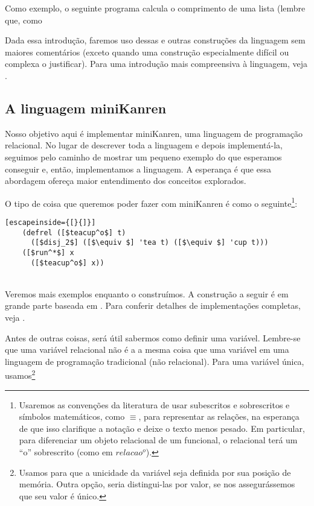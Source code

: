 \documentclass{article}
\begin{document}
  Como exemplo, o seguinte programa calcula o comprimento de uma lista
  (lembre que, como 

  Dada essa introdução, faremos uso dessas e outras construções da
  linguagem sem maiores comentários (exceto quando uma construção
  especialmente difícil ou complexa o justificar). Para uma introdução
  mais compreensiva à linguagem, veja \cite{kent}.

  \subsection{A linguagem miniKanren}

  Nosso objetivo aqui é implementar miniKanren, uma linguagem de
  programação relacional. No lugar de descrever toda a linguagem e
  depois implementá-la, seguimos pelo caminho de mostrar um pequeno
  exemplo do que esperamos conseguir e, então, implementamos a
  linguagem. A esperança é que essa abordagem ofereça maior
  entendimento dos conceitos explorados.

  O tipo de coisa que queremos poder fazer com miniKanren é como o
  seguinte\footnote{Usaremos as convenções da literatura de usar
    subescritos e sobrescritos e símbolos matemáticos, como $\equiv $, para
    representar as relações, na esperança de que isso clarifique a
    notação e deixe o texto menos pesado. Em particular, para
    diferenciar um objeto relacional de um funcional, o relacional
    terá um ``o'' sobrescrito (como em $relacao^o$).}:\\

  \begin{lstlisting}[escapeinside={[}{]}]
    (defrel ([$teacup^o$] t)
      ([$disj_2$] ([$\equiv $] 'tea t) ([$\equiv $] 'cup t)))
    ([$run^*$] x
      ([$teacup^o$] x))
  \end{lstlisting}
  \hspace{1cm} \seta {}\\

  Veremos mais exemplos enquanto o construímos. A construção a seguir
  é em grande parte baseada em \cite{will}. Para conferir detalhes de
  implementações completas, veja \cite{kanren}.

  Antes de outras coisas, será útil sabermos como definir uma
  variável. Lembre-se que uma variável relacional não é a a mesma
  coisa que uma variável em uma linguagem de programação tradicional
  (não relacional). Para uma variável única, usamos\footnote{Usamos
     para que a unicidade da variável seja definida
    por sua posição de memória. Outra opção, seria distingui-las por
    valor, se nos assegurássemos que seu valor é único.}
  
\end{document}
